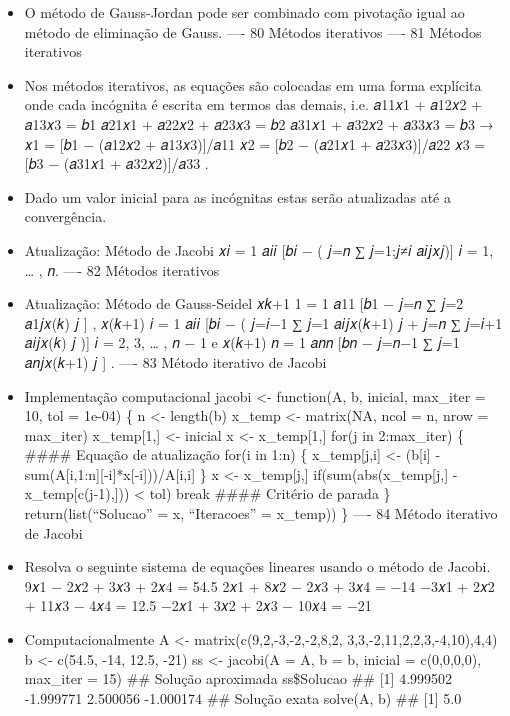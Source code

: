 \documentclass[
]{article}
\providecommand{\tightlist}{%
  \setlength{\itemsep}{0pt}\setlength{\parskip}{0pt}}
\begin{document}
\begin{itemize}
\tightlist
\item
  O método de Gauss-Jordan pode ser combinado com pivotação igual ao
  método de eliminação de Gauss. ---- 80 Métodos iterativos ---- 81
  Métodos iterativos
\item
  Nos métodos iterativos, as equações são colocadas em uma forma
  explícita onde cada incógnita é escrita em termos das demais, i.e.
  𝑎11𝑥1 + 𝑎12𝑥2 + 𝑎13𝑥3 = 𝑏1 𝑎21𝑥1 + 𝑎22𝑥2 + 𝑎23𝑥3 = 𝑏2 𝑎31𝑥1 + 𝑎32𝑥2 +
  𝑎33𝑥3 = 𝑏3 → 𝑥1 = {[}𝑏1 − (𝑎12𝑥2 + 𝑎13𝑥3){]}/𝑎11 𝑥2 = {[}𝑏2 − (𝑎21𝑥1 +
  𝑎23𝑥3){]}/𝑎22 𝑥3 = {[}𝑏3 − (𝑎31𝑥1 + 𝑎32𝑥2){]}/𝑎33 .
\item
  Dado um valor inicial para as incógnitas estas serão atualizadas até a
  convergência.
\item
  Atualização: Método de Jacobi 𝑥𝑖 = 1 𝑎𝑖𝑖 {[}𝑏𝑖 − ( 𝑗=𝑛 ∑ 𝑗=1;𝑗≠𝑖
  𝑎𝑖𝑗𝑥𝑗){]} 𝑖 = 1, \ldots{} , 𝑛. ---- 82 Métodos iterativos
\item
  Atualização: Método de Gauss-Seidel 𝑥𝑘+1 1 = 1 𝑎11 {[}𝑏1 − 𝑗=𝑛 ∑ 𝑗=2
  𝑎1𝑗𝑥(𝑘) 𝑗 {]} , 𝑥(𝑘+1) 𝑖 = 1 𝑎𝑖𝑖 {[}𝑏𝑖 − ( 𝑗=𝑖−1 ∑ 𝑗=1 𝑎𝑖𝑗𝑥(𝑘+1) 𝑗 +
  𝑗=𝑛 ∑ 𝑗=𝑖+1 𝑎𝑖𝑗𝑥(𝑘) 𝑗 ){]} 𝑖 = 2, 3, \ldots{} , 𝑛 − 1 e 𝑥(𝑘+1) 𝑛 = 1
  𝑎𝑛𝑛 {[}𝑏𝑛 − 𝑗=𝑛−1 ∑ 𝑗=1 𝑎𝑛𝑗𝑥(𝑘+1) 𝑗 {]} . ---- 83 Método iterativo de
  Jacobi
\item
  Implementação computacional jacobi \textless- function(A, b, inicial,
  max\_iter = 10, tol = 1e-04) \{ n \textless- length(b) x\_temp
  \textless- matrix(NA, ncol = n, nrow = max\_iter) x\_temp{[}1,{]}
  \textless- inicial x \textless- x\_temp{[}1,{]} for(j in 2:max\_iter)
  \{ \#\#\#\# Equação de atualização for(i in 1:n) \{ x\_temp{[}j,i{]}
  \textless- (b{[}i{]} - sum(A{[}i,1:n{]}{[}-i{]}*x{[}-i{]}))/A{[}i,i{]}
  \} x \textless- x\_temp{[}j,{]} if(sum(abs(x\_temp{[}j,{]} -
  x\_temp{[}c(j-1),{]})) \textless{} tol) break \#\#\#\# Critério de
  parada \} return(list(``Solucao'' = x, ``Iteracoes'' = x\_temp)) \}
  ---- 84 Método iterativo de Jacobi
\item
  Resolva o seguinte sistema de equações lineares usando o método de
  Jacobi. 9𝑥1 − 2𝑥2 + 3𝑥3 + 2𝑥4 = 54.5 2𝑥1 + 8𝑥2 − 2𝑥3 + 3𝑥4 = −14 −3𝑥1
  + 2𝑥2 + 11𝑥3 − 4𝑥4 = 12.5 −2𝑥1 + 3𝑥2 + 2𝑥3 − 10𝑥4 = −21
\item
  Computacionalmente A \textless- matrix(c(9,2,-3,-2,-2,8,2,
  3,3,-2,11,2,2,3,-4,10),4,4) b \textless- c(54.5, -14, 12.5, -21) ss
  \textless- jacobi(A = A, b = b, inicial = c(0,0,0,0), max\_iter = 15)
  \#\# Solução aproximada ss\$Solucao \#\# {[}1{]} 4.999502 -1.999771
  2.500056 -1.000174 \#\# Solução exata solve(A, b) \#\# {[}1{]} 5.0

\end{itemize}
\end{document}
